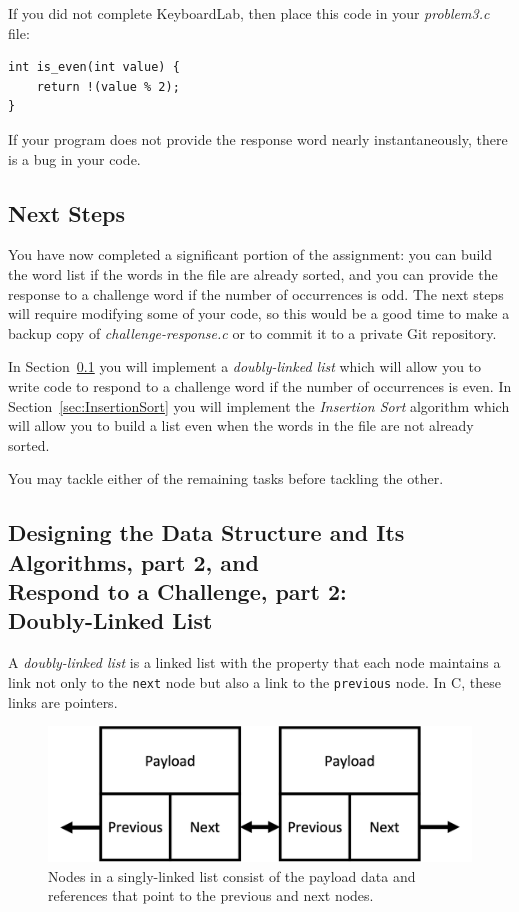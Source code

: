 If you did not complete KeyboardLab, then place this code in your
\textit{problem3.c} file:

\begin{lstlisting}
int is_even(int value) {
    return !(value % 2);
}
\end{lstlisting}

If your program does not provide the response word nearly instantaneously,
there is a bug in your code.

\subsection*{Next Steps}

You have now completed a significant portion of the assignment: you can build
the word list if the words in the file are already sorted, and you can provide
the response to a challenge word if the number of occurrences is odd. The next
steps will require modifying some of your code, so this would be a good time to
make a backup copy of \textit{challenge-response.c} or to commit it to a
private Git repository.

In Section~\ref{sec:DoublyLinkedList} you will implement a
\textit{doubly-linked list} which will allow you to write code to respond to a
challenge word if the number of occurrences is even. In
Section~\ref{sec:InsertionSort} you will implement the \textit{Insertion Sort}
algorithm which will allow you to build a list even when the words in the file
are not already sorted.

You may tackle either of the remaining tasks before tackling the other.

\subsection{Designing the Data Structure and Its Algorithms, part 2, and \\
    Respond to a Challenge, part 2: \\
    Doubly-Linked List}\label{sec:DoublyLinkedList}

A \textit{doubly-linked list} is a linked list with the property that each node
maintains a link not only to the \lstinline{next} node but also a link to the
\lstinline{previous} node. In C, these links are pointers.

\begin{figure}[h]
    \centering
    \includegraphics[scale=0.5]{doubly-linked-list}
    \caption{Nodes in a singly-linked list consist of the payload data and references that point to the previous and next nodes.}
\end{figure}

